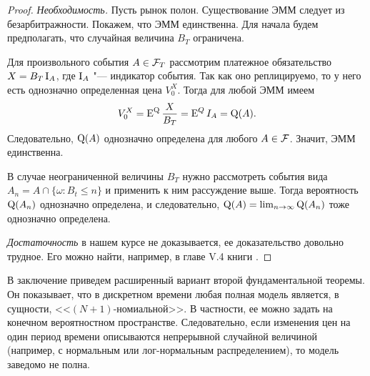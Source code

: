\begin{proof}
\textit{Необходимость.} Пусть рынок полон.
Существование ЭММ следует из безарбитражности.
Покажем, что ЭММ единственна.
Для начала будем предполагать, что случайная величина $B_T$ ограничена. 

Для произвольного события $A\in\mathcal{F}_T$ рассмотрим платежное обязательство $X=B_T \operatorname{I}_A$, где $\operatorname{I}_A$ "--- индикатор события.
Так как оно реплицируемо, то у него есть однозначно определенная цена $V_0^X$.
Тогда для любой ЭММ имеем 
\[
V_0^X = \operatorname{E}^{\mathrm{Q}}\frac{X}{B_T} = \operatorname{E}^Q I_A = \mathrm{Q}(A).
\]
Следовательно, $\mathrm{Q}(A)$ однозначно определена для любого $A\in \mathcal{F}$.
Значит, ЭММ единственна.

В случае неограниченной величины $B_T$ нужно рассмотреть события вида $A_n = A\cap \{\omega: B_t \le n\}$ и применить к ним рассуждение выше.
Тогда вероятность $\mathrm{Q}(A_n)$ однозначно определена, и следовательно, $\mathrm{Q}(A) = \lim_{n\to\infty} \mathrm{Q}(A_n)$ тоже однозначно определена.

\textit{Достаточность} в нашем курсе не доказывается, ее доказательство довольно трудное.
Его можно найти, например, в главе V.4 книги \cite{Shiryaev98}.
\end{proof}

В заключение приведем расширенный вариант второй фундаментальной теоремы.
Он показывает, что в дискретном времени любая полная модель является, в сущности, <<$(N+1)$-номиальной>>.
В частности, ее можно задать на конечном вероятностном пространстве. 
Следовательно, если изменения цен на один период времени описываются непрерывной случайной величиной (например, с нормальным или лог-нормальным распределением), то модель заведомо не полна.

